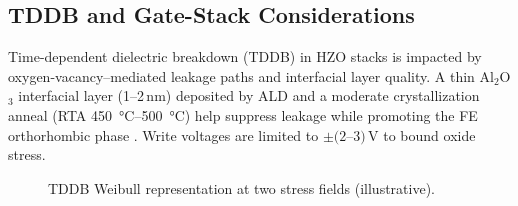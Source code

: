 \documentclass[journal]{IEEEtran}
\begin{document}
\subsection*{TDDB and Gate-Stack Considerations}
Time-dependent dielectric breakdown (TDDB) in HZO stacks is impacted by oxygen-vacancy–mediated leakage paths and interfacial layer quality. A thin Al$_2$O$_3$ interfacial layer (1--2\,nm) deposited by ALD and a moderate crystallization anneal (RTA \SI{450}{\celsius}--\SI{500}{\celsius}) help suppress leakage while promoting the FE orthorhombic phase \cite{Schenk2019,Muller2015}. Write voltages are limited to $\pm(2$--$3)$\,V to bound oxide stress.

\begin{figure}[t]
\centering
{}
\caption{TDDB Weibull representation at two stress fields (illustrative).}
\label{fig:tddb}
\end{figure}
\end{document}
